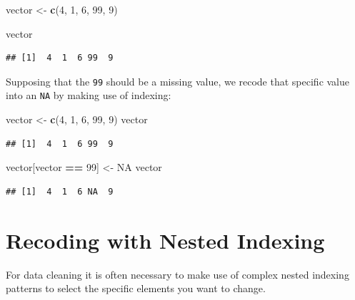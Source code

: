 \documentclass[
]{book}
\newenvironment{Shaded}{\begin{snugshade}}{\end{snugshade}}
\newcommand{\ConstantTok}[1]{\textcolor[rgb]{0.56,0.35,0.01}{#1}}
\newcommand{\DecValTok}[1]{\textcolor[rgb]{0.00,0.00,0.81}{#1}}
\newcommand{\FunctionTok}[1]{\textcolor[rgb]{0.13,0.29,0.53}{\textbf{#1}}}
\newcommand{\NormalTok}[1]{#1}
\newcommand{\OtherTok}[1]{\textcolor[rgb]{0.56,0.35,0.01}{#1}}
\newcommand{\SpecialCharTok}[1]{\textcolor[rgb]{0.81,0.36,0.00}{\textbf{#1}}}
\begin{document}
\begin{Shaded}
\begin{Highlighting}[]
\NormalTok{vector }\OtherTok{\textless{}{-}} \FunctionTok{c}\NormalTok{(}\DecValTok{4}\NormalTok{, }\DecValTok{1}\NormalTok{, }\DecValTok{6}\NormalTok{, }\DecValTok{99}\NormalTok{, }\DecValTok{9}\NormalTok{)}

\NormalTok{vector}
\end{Highlighting}
\end{Shaded}

\begin{verbatim}
## [1]  4  1  6 99  9
\end{verbatim}

Supposing that the \texttt{99} should be a missing value, we recode that specific value into an \texttt{NA} by making use of indexing:

\begin{Shaded}
\begin{Highlighting}[]
\NormalTok{vector }\OtherTok{\textless{}{-}} \FunctionTok{c}\NormalTok{(}\DecValTok{4}\NormalTok{, }\DecValTok{1}\NormalTok{, }\DecValTok{6}\NormalTok{, }\DecValTok{99}\NormalTok{, }\DecValTok{9}\NormalTok{)}
\NormalTok{vector}
\end{Highlighting}
\end{Shaded}

\begin{verbatim}
## [1]  4  1  6 99  9
\end{verbatim}

\begin{Shaded}
\begin{Highlighting}[]
\NormalTok{vector[vector }\SpecialCharTok{==} \DecValTok{99}\NormalTok{] }\OtherTok{\textless{}{-}} \ConstantTok{NA}
\NormalTok{vector}
\end{Highlighting}
\end{Shaded}

\begin{verbatim}
## [1]  4  1  6 NA  9
\end{verbatim}

\section{Recoding with Nested Indexing}\label{recoding-with-nested-indexing}

For data cleaning it is often necessary to make use of complex nested indexing patterns to select the specific elements you want to change.
\end{document}
